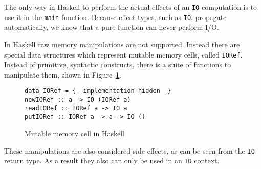 The only way in Haskell to perform the actual effects of an \texttt{IO}
computation is to use it in the \texttt{main} function. Because effect types,
such as \texttt{IO}, propagate automatically, we know that a pure function can
never perform I/O.

In Haskell raw memory manipulations are not supported. Instead there are special
data structures which represent mutable memory cells, called \texttt{IORef}.
Instead of primitive, syntactic constructs, there is a suite of functions to
manipulate them, shown in Figure~\ref{fig:io-ref}.

\begin{figure}
  \begin{lstlisting}
data IORef = {- implementation hidden -}
newIORef :: a -> IO (IORef a)
readIORef :: IORef a -> IO a
putIORef :: IORef a -> a -> IO ()
  \end{lstlisting}
  \caption{Mutable memory cell in Haskell}
  \label{fig:io-ref}
\end{figure}

These manipulations are also considered side effects, as can be seen from the
\texttt{IO} return type. As a result they also can only be used in an
\texttt{IO} context.

